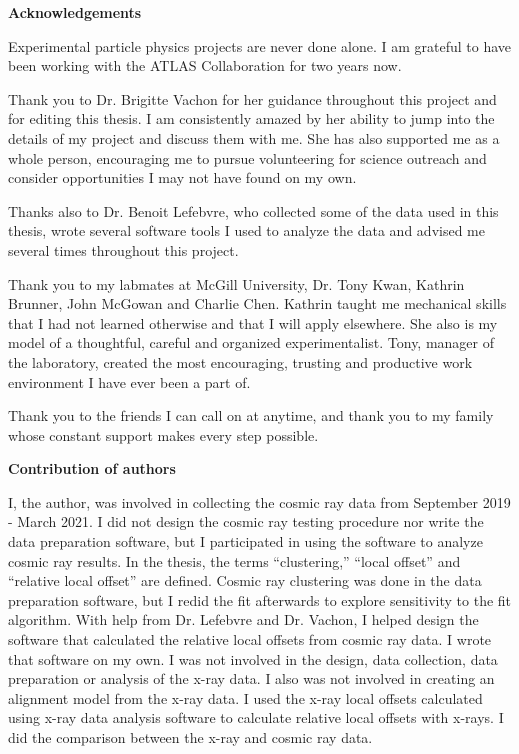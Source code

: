 \cleardoublepage


\begin{center}\textbf{Acknowledgements}\end{center}

Experimental particle physics projects are never done alone. I am grateful to have been working with the ATLAS Collaboration for two years now.

Thank you to Dr. Brigitte Vachon for her guidance throughout this project and for editing this thesis. I am consistently amazed by her ability to jump into the details of my project and discuss them with me. She has also supported me as a whole person, encouraging me to pursue volunteering for science outreach and consider opportunities I may not have found on my own.

Thanks also to Dr. Benoit Lefebvre, who collected some of the data used in this thesis, wrote several software tools I used to analyze the data and advised me several times throughout this project. 

Thank you to my labmates at McGill University, Dr. Tony Kwan, Kathrin Brunner, John McGowan and Charlie Chen. Kathrin taught me mechanical skills that I had not learned otherwise and that I will apply elsewhere. She also is my model of a thoughtful, careful and organized experimentalist. Tony, manager of the laboratory, created the most encouraging, trusting and productive work environment I have ever been a part of.

Thank you to the friends I can call on at anytime, and thank you to my family whose constant support makes every step possible.

\cleardoublepage

 \begin{center}\textbf{Contribution of authors}\end{center}
  
 \noindent

I, the author, was involved in collecting the cosmic ray data from September 2019 - March 2021. I did not design the cosmic ray testing procedure nor write the data preparation software, but I participated in using the software to analyze cosmic ray results. In the thesis, the terms ``clustering,'' ``local offset'' and ``relative local offset'' are defined. Cosmic ray clustering was done in the data preparation software, but I redid the fit afterwards to explore sensitivity to the fit algorithm. With help from Dr. Lefebvre and Dr. Vachon, I helped design the software that calculated the relative local offsets from cosmic ray data. I wrote that software on my own. I was not involved in the design, data collection, data preparation or analysis of the x-ray data. I also was not involved in creating an alignment model from the x-ray data. I used the x-ray local offsets calculated using x-ray data analysis software to calculate relative local offsets with x-rays. I did the comparison between the x-ray and cosmic ray data.

